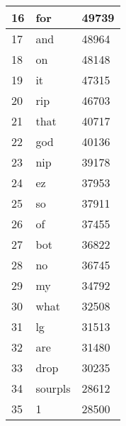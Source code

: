 \documentclass[final]{report}
\begin{document}
\begin{table}[]
\begin{tabular}{l|l|l|}
\multicolumn{1}{|l|}{16} & for          & 49739     \\ \hline
\multicolumn{1}{|l|}{17} & and          & 48964     \\ \hline
\multicolumn{1}{|l|}{18} & on           & 48148     \\ \hline
\multicolumn{1}{|l|}{19} & it           & 47315     \\ \hline
\multicolumn{1}{|l|}{20} & rip          & 46703     \\ \hline
\multicolumn{1}{|l|}{21} & that         & 40717     \\ \hline
\multicolumn{1}{|l|}{22} & god          & 40136     \\ \hline
\multicolumn{1}{|l|}{23} & nip          & 39178     \\ \hline
\multicolumn{1}{|l|}{24} & ez           & 37953     \\ \hline
\multicolumn{1}{|l|}{25} & so           & 37911     \\ \hline
\multicolumn{1}{|l|}{26} & of           & 37455     \\ \hline
\multicolumn{1}{|l|}{27} & bot          & 36822     \\ \hline
\multicolumn{1}{|l|}{28} & no           & 36745     \\ \hline
\multicolumn{1}{|l|}{29} & my           & 34792     \\ \hline
\multicolumn{1}{|l|}{30} & what         & 32508     \\ \hline
\multicolumn{1}{|l|}{31} & lg           & 31513     \\ \hline
\multicolumn{1}{|l|}{32} & are          & 31480     \\ \hline
\multicolumn{1}{|l|}{33} & drop         & 30235     \\ \hline
\multicolumn{1}{|l|}{34} & sourpls      & 28612     \\ \hline
\multicolumn{1}{|l|}{35} & 1            & 28500     \\ \hline
\end{tabular}
\end{table}
\end{document}

